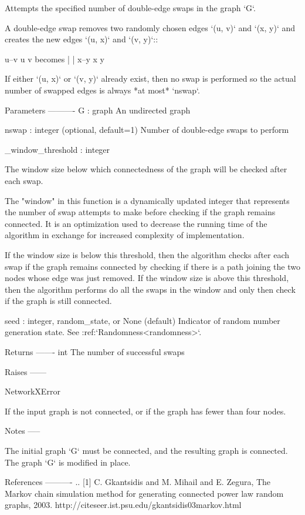 \begin{DoxyVerb}Attempts the specified number of double-edge swaps in the graph `G`.

A double-edge swap removes two randomly chosen edges `(u, v)` and `(x,
y)` and creates the new edges `(u, x)` and `(v, y)`::

 u--v            u  v
        becomes  |  |
 x--y            x  y

If either `(u, x)` or `(v, y)` already exist, then no swap is performed
so the actual number of swapped edges is always *at most* `nswap`.

Parameters
----------
G : graph
   An undirected graph

nswap : integer (optional, default=1)
   Number of double-edge swaps to perform

_window_threshold : integer

   The window size below which connectedness of the graph will be checked
   after each swap.

   The "window" in this function is a dynamically updated integer that
   represents the number of swap attempts to make before checking if the
   graph remains connected. It is an optimization used to decrease the
   running time of the algorithm in exchange for increased complexity of
   implementation.

   If the window size is below this threshold, then the algorithm checks
   after each swap if the graph remains connected by checking if there is a
   path joining the two nodes whose edge was just removed. If the window
   size is above this threshold, then the algorithm performs do all the
   swaps in the window and only then check if the graph is still connected.

seed : integer, random_state, or None (default)
    Indicator of random number generation state.
    See :ref:`Randomness<randomness>`.

Returns
-------
int
   The number of successful swaps

Raises
------

NetworkXError

   If the input graph is not connected, or if the graph has fewer than four
   nodes.

Notes
-----

The initial graph `G` must be connected, and the resulting graph is
connected. The graph `G` is modified in place.

References
----------
.. [1] C. Gkantsidis and M. Mihail and E. Zegura,
       The Markov chain simulation method for generating connected
       power law random graphs, 2003.
       http://citeseer.ist.psu.edu/gkantsidis03markov.html
\end{DoxyVerb}
 \mbox{\label{namespacenetworkx_1_1algorithms_1_1swap_a05e63bb95be054d5c3e7c4f9144b0040}} 
